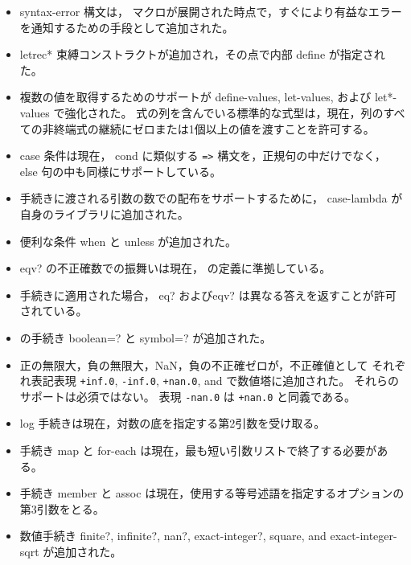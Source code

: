\begin{itemize}
\item {\cf syntax-error} 構文は，
マクロが展開された時点で，すぐにより有益なエラーを通知するための手段として追加された。

\item {\cf letrec*} 束縛コンストラクトが追加され，その点で内部 {\cf define} が指定された。

\item 複数の値を取得するためのサポートが {\cf define-values}, {\cf let-values}, および {\cf let*-values} で強化された。
式の列を含んでいる標準的な式型は，現在，列のすべての非終端式の継続にゼロまたは1個以上の値を渡すことを許可する。

\item {\cf case} 条件は現在， {\cf cond} に類似する {\tt =>} 構文を，正規句の中だけでなく， {\cf else} 句の中も同様にサポートしている。

\item 手続きに渡される引数の数での配布をサポートするために， {\cf case-lambda} が自身のライブラリに追加された。

\item 便利な条件 {\cf when} と {\cf unless} が追加された。

\item {\cf eqv?} の不正確数での振舞いは現在， \rsixrs の定義に準拠している。

\item 手続きに適用された場合， {\cf eq?} および{\cf eqv?} は異なる答えを返すことが許可されている。

\item \rsixrs の手続き {\cf boolean=?} と {\cf symbol=?} が追加された。

\item 正の無限大，負の無限大，NaN，負の不正確ゼロが，不正確値として
それぞれ表記表現 {\tt +inf.0}, {\tt -inf.0}, {\tt +nan.0}, and {} で数値塔に追加された。
それらのサポートは必須ではない。
表現 {\tt -nan.0} は {\tt +nan.0} と同義である。

\item {\cf log} 手続きは現在，対数の底を指定する第2引数を受け取る。

\item 手続き {\cf map} と {\cf for-each} は現在，最も短い​​引数リストで終了する必要がある。

\item 手続き {\cf member} と {\cf assoc} は現在，使用する等号述語を指定するオプションの第3引数をとる。

\item 数値手続き {\cf finite?}, {\cf infinite?}, {\cf nan?}, {\cf exact-integer?}, {\cf square}, and {\cf exact-integer-sqrt} が追加された。


\end{itemize}
